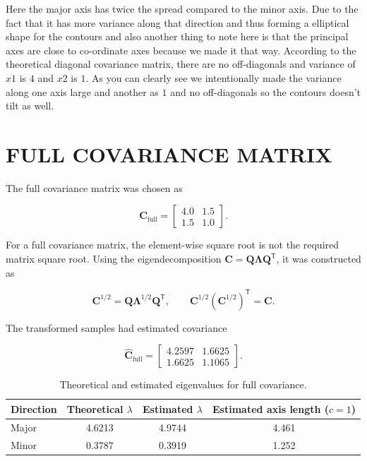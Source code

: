 \documentclass[12pt]{article}
\begin{document}
Here the major axis has twice the spread compared to the minor axis. Due to the fact that it has more variance along that direction and thus forming a elliptical shape for the contours and also another thing to note here is that the principal axes are close to co-ordinate axes because we made it that way. According to the theoretical diagonal covariance matrix, there are no off-diagonals and variance of $x1$ is $4$ and $x2$ is $1$. As you can clearly see we intentionally made the variance along one axis large and another as $1$ and no off-diagonals so the contours doesn't tilt as well.

\section*{FULL COVARIANCE MATRIX}

The full covariance matrix was chosen as

\begin{equation}
  \mathbf{C}_{\mathrm{full}}=
  \begin{bmatrix}
    4.0 & 1.5\\
    1.5 & 1.0
  \end{bmatrix}.
\end{equation}

For a full covariance matrix, the element-wise square root is not the required
matrix square root. Using the eigendecomposition
$\mathbf{C}=\mathbf{Q}\boldsymbol{\Lambda}\mathbf{Q}^{\mathsf T}$, it was
constructed as

\begin{equation}
  \mathbf{C}^{1/2}=
  \mathbf{Q}\boldsymbol{\Lambda}^{1/2}\mathbf{Q}^{\mathsf T},
  \qquad
  \mathbf{C}^{1/2}(\mathbf{C}^{1/2})^{\mathsf T}=\mathbf{C}.
  \label{eq:matrix-square-root}
\end{equation}

The transformed samples had estimated covariance

\begin{equation}
  \hat{\mathbf{C}}_{\mathrm{full}}=
  \begin{bmatrix}
    4.2597 & 1.6625\\
    1.6625 & 1.1065
  \end{bmatrix}.
\end{equation}

\begin{table}[H]
  \centering
  \caption{Theoretical and estimated eigenvalues for full covariance.}
  \begin{tabular}{lccc}
    \toprule
    Direction & Theoretical $\lambda$ & Estimated $\lambda$ & Estimated axis length ($c=1$) \\
    \midrule
    Major & 4.6213 & 4.9744 & 4.461 \\
    Minor & 0.3787 & 0.3919 & 1.252 \\
    \bottomrule
  \end{tabular}
\end{table}
\end{document}
